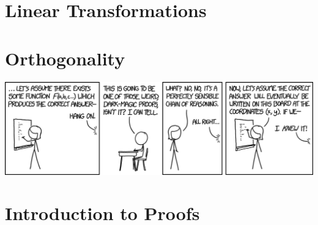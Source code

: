 \documentclass[oneside]{book}
\begin{document}
\chapter{Linear Transformations}

    

\begin{savequote}

\end{savequote}
\chapter{Orthogonality}

    

\appendix
\appendixpage
\noappendicestocpagenum
\addappheadtotoc
\begin{savequote}
    \includegraphics[scale=0.5]{Graphics/proofxkcd.png}
\end{savequote}
\chapter{Introduction to Proofs}

    
        
\end{document}
